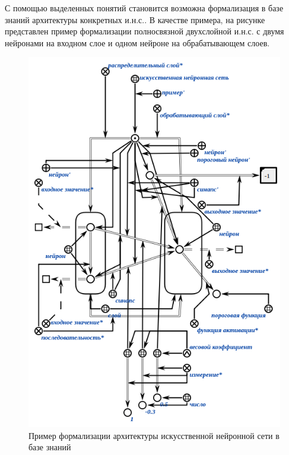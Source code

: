 \begin{SCn}
\end{SCn}

\begin{SCn}
\end{SCn}

С помощью выделенных понятий становится возможна формализация в базе знаний архитектуры конкретных и.н.с.. В качестве примера, на рисунке \textit{} представлен пример формализации полносвязной двухслойной и.н.с. с двумя нейронами на входном слое и одном нейроне на обрабатывающем слоев.

\begin{figure}
	\centering
	\includegraphics[width=0.8\linewidth]{author/part3/figures/neural_network_scg.png}
	\caption{Пример формализации архитектуры искусственной нейронной сети в базе знаний}
	\label{fig:neural_network_scg}
\end{figure}

